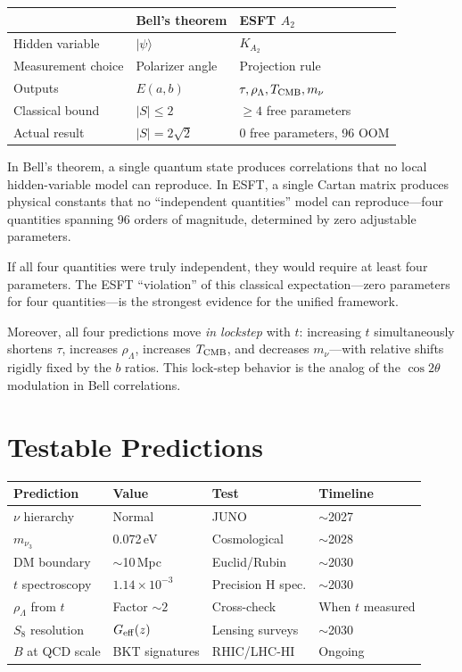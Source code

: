 \documentclass[twocolumn,preprintnumbers,amsmath,amssymb,prd]{revtex4-2}
\begin{document}
\begin{center}
\begin{tabular}{lll}
\toprule
& Bell's theorem & ESFT $A_2$ \\
\midrule
Hidden variable & $|\psi\rangle$ & $K_{A_2}$ \\
Measurement choice & Polarizer angle & Projection rule \\
Outputs & $E(a,b)$ & $\tau, \rho_\Lambda, T_{\rm CMB}, m_\nu$ \\
Classical bound & $|S| \leq 2$ & $\geq 4$ free parameters \\
Actual result & $|S| = 2\sqrt{2}$ & 0 free parameters, 96 OOM \\
\bottomrule
\end{tabular}
\end{center}

In Bell's theorem, a single quantum state produces correlations that no local hidden-variable model can reproduce.
In ESFT, a single Cartan matrix produces physical constants that no ``independent quantities'' model can reproduce---four quantities spanning 96 orders of magnitude, determined by zero adjustable parameters.

If all four quantities were truly independent, they would require at least four parameters.
The ESFT ``violation'' of this classical expectation---zero parameters for four quantities---is the strongest evidence for the unified framework.

Moreover, all four predictions move \emph{in lockstep} with $t$: increasing $t$ simultaneously shortens $\tau$, increases $\rho_\Lambda$, increases $T_{\rm CMB}$, and decreases $m_\nu$---with relative shifts rigidly fixed by the $b$ ratios.
This lock-step behavior is the analog of the $\cos 2\theta$ modulation in Bell correlations.

\section{Testable Predictions}
\label{sec:tests}

\begin{center}
\begin{tabular}{llll}
\toprule
Prediction & Value & Test & Timeline \\
\midrule
$\nu$ hierarchy & Normal & JUNO & $\sim$2027 \\
$m_{\nu_3}$ & 0.072\,eV & Cosmological & $\sim$2028 \\
DM boundary & $\sim$10\,Mpc & Euclid/Rubin & $\sim$2030 \\
$t$ spectroscopy & $1.14\times10^{-3}$ & Precision H spec. & $\sim$2030 \\
$\rho_\Lambda$ from $t$ & Factor $\sim 2$ & Cross-check & When $t$ measured \\
$S_8$ resolution & $G_{\rm eff}(z)$ & Lensing surveys & $\sim$2030 \\
$B$ at QCD scale & BKT signatures & RHIC/LHC-HI & Ongoing \\
\bottomrule
\end{tabular}
\end{center}
\end{document}
